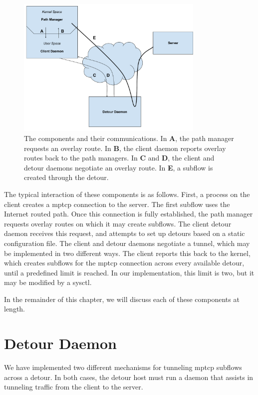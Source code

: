 \documentclass{cwru}
\begin{document}
\begin{figure}[h]
  \centering
  \includegraphics[width=0.8\textwidth]{figures/MovingParts.pdf}
  \caption[Interaction of client, detour, and server]{
    The components and their communications. In \textbf{A}, the path manager
    requests an overlay route. In \textbf{B}, the client daemon reports overlay
    routes back to the path managers. In \textbf{C} and \textbf{D}, the client
    and detour daemons negotiate an overlay route. In \textbf{E}, a subflow is
    created through the detour.
  }
  \label{f:MovingParts}
\end{figure}

The typical interaction of these components is as follows. First, a process on
the client creates a \ac{mptcp} connection to the server. The first subflow uses
the Internet routed path. Once this connection is fully established, the path
manager requests overlay routes on which it may create subflows. The client
detour daemon receives this request, and attempts to set up detours based on a
static configuration file. The client and detour daemons negotiate a tunnel,
which may be implemented in two different ways. The client reports this back to
the kernel, which creates subflows for the \ac{mptcp} connection across every
available detour, until a predefined limit is reached. In our implementation,
this limit is two, but it may be modified by a sysctl.

In the remainder of this chapter, we will discuss each of these components at
length.

\section{Detour Daemon}

We have implemented two different mechanisms for tunneling \ac{mptcp} subflows across
a detour. In both cases, the detour host must run a daemon that assists in
tunneling traffic from the client to the server.
\end{document}
